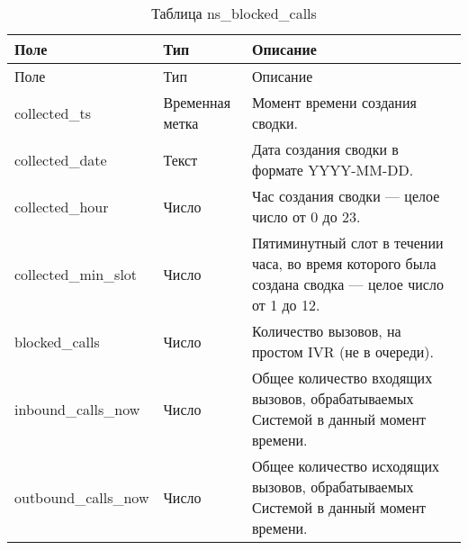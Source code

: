 \begin{small}
    \begin{longtable}{|p{}|p{}|p{}|}
        \caption{Таблица ns\_blocked\_calls}
        \label{tab:db:ns-blocked-calls}
        \\ \hline
        Поле & Тип & Описание \\
        \hline \endfirsthead
        \hline
        Поле & Тип & Описание \\
        \hline
        \endhead
        \hline \endlastfoot
        collected\_ts &
        Временная метка &
        Момент времени создания сводки.\\
\hline

        collected\_date &
        Текст &
        Дата создания сводки в формате YYYY-MM-DD.\\
\hline

        collected\_hour &
        Число &
        Час создания сводки — целое число от 0 до 23.\\
\hline

        collected\_min\_slot &
        Число &
        Пятиминутный слот в течении часа, во время которого была создана сводка — целое число от 1 до 12.\\
\hline

        blocked\_calls &
        Число &
        Количество вызовов, на простом IVR (не в очереди).\\
\hline

        inbound\_calls\_now &
        Число &
        Общее количество входящих вызовов, обрабатываемых Системой в данный момент времени.\\
\hline

        outbound\_calls\_now &
        Число &
        Общее количество исходящих вызовов, обрабатываемых Системой в данный момент времени.\\
    \end{longtable}
\end{small}


